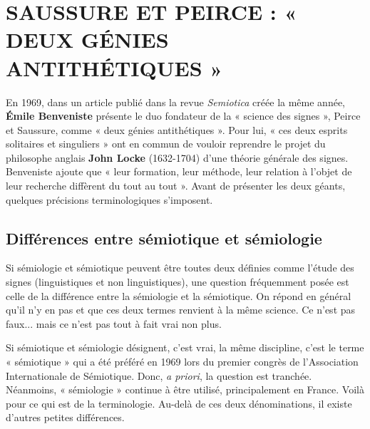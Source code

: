 \section{SAUSSURE ET PEIRCE : « DEUX GÉNIES ANTITHÉTIQUES »}
En 1969, dans un article publié dans la revue \textit{Semiotica} créée la même année, \textbf{Émile Benveniste} présente le duo fondateur de la « science des signes », Peirce et Saussure, comme « deux génies antithétiques ». Pour lui, « ces deux esprits solitaires et singuliers » ont en commun de vouloir reprendre le projet du philosophe anglais \textbf{John Locke} (1632-1704) d’une théorie générale des signes. Benveniste ajoute que « leur formation, leur méthode, leur relation à l’objet de leur recherche diffèrent du tout au tout ». Avant de présenter les deux géants, quelques précisions terminologiques s’imposent.

\subsection{Différences entre sémiotique et sémiologie}
Si sémiologie et sémiotique peuvent être toutes deux définies comme l’étude des signes (linguistiques et non linguistiques), une question fréquemment posée est celle de la différence entre la sémiologie et la sémiotique. On répond en général qu’il n’y en pas et que ces deux termes renvient à la même science. Ce n’est pas faux... mais ce n’est pas tout à fait vrai non plus.

Si sémiotique et sémiologie désignent, c’est vrai, la même discipline, c’est le terme « sémiotique » qui a été préféré en 1969 lors du premier congrès de l’Association Internationale de Sémiotique. Donc, \textit{a priori}, la question est tranchée. Néanmoins, « sémiologie » continue à être utilisé, principalement en France. Voilà pour ce qui est de la terminologie. Au-delà de ces deux dénominations, il existe d’autres petites différences.

